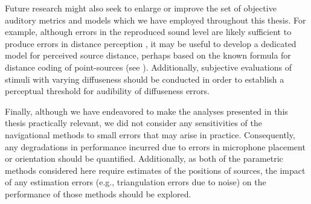 Future research might also seek to enlarge or improve the set of objective auditory metrics and models which we have employed throughout this thesis.
For example, although errors in the reproduced sound level are likely sufficient to produce errors in distance perception \citep[section 3.1.1]{Zahorik2005}, it may be useful to develop a dedicated model for perceived source distance, perhaps based on the known formula for distance coding of point-sources (see ).
Additionally, subjective evaluations of stimuli with varying diffuseness should be conducted in order to establish a perceptual threshold for audibility of diffuseness errors.

Finally, although we have endeavored to make the analyses presented in this thesis practically relevant, we did not consider any sensitivities of the navigational methods to small errors that may arise in practice.
Consequently, any degradations in performance incurred due to errors in microphone placement or orientation should be quantified.
Additionally, as both of the parametric methods considered here require estimates of the positions of sources, the impact of any estimation errors (e.g., triangulation errors due to noise) on the performance of those methods should be explored.